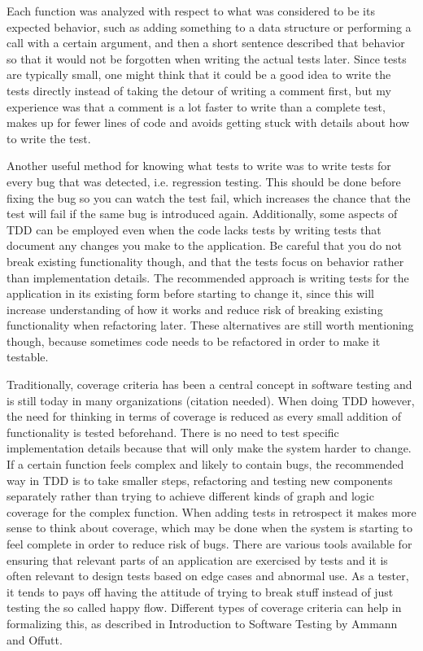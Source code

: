 \documentclass[11pt]{article}
\begin{document}
Each function was analyzed with respect to what was considered to be its expected behavior, such as adding something to a data structure or performing a call with a certain argument, and then a short sentence described that behavior so that it would not be forgotten when writing the actual tests later. Since tests are typically small, one might think that it could be a good idea to write the tests directly instead of taking the detour of writing a comment first, but my experience was that a comment is a lot faster to write than a complete test, makes up for fewer lines of code and avoids getting stuck with details about how to write the test.

Another useful method for knowing what tests to write was to write tests for every bug that was detected, i.e. regression testing. This should be done before fixing the bug so you can watch the test fail, which increases the chance that the test will fail if the same bug is introduced again. Additionally, some aspects of TDD can be employed even when the code lacks tests by writing tests that document any changes you make to the application. Be careful that you do not break existing functionality though, and that the tests focus on behavior rather than implementation details. The recommended approach is writing tests for the application in its existing form before starting to change it, since this will increase understanding of how it works and reduce risk of breaking existing functionality when refactoring later. These alternatives are still worth mentioning though, because sometimes code needs to be refactored in order to make it testable.

Traditionally, coverage criteria has been a central concept in software testing and is still today in many organizations (citation needed). When doing TDD however, the need for thinking in terms of coverage is reduced as every small addition of functionality is tested beforehand. There is no need to test specific implementation details because that will only make the system harder to change. If a certain function feels complex and likely to contain bugs, the recommended way in TDD is to take smaller steps, refactoring and testing new components separately rather than trying to achieve different kinds of graph and logic coverage for the complex function. When adding tests in retrospect it makes more sense to think about coverage, which may be done when the system is starting to feel complete in order to reduce risk of bugs. There are various tools available for ensuring that relevant parts of an application are exercised by tests and it is often relevant to design tests based on edge cases and abnormal use. As a tester, it tends to pays off having the attitude of trying to break stuff instead of just testing the so called happy flow. Different types of coverage criteria can help in formalizing this, as described in Introduction to Software Testing by Ammann and Offutt\cite{AmmannOffutt}.
\end{document}
